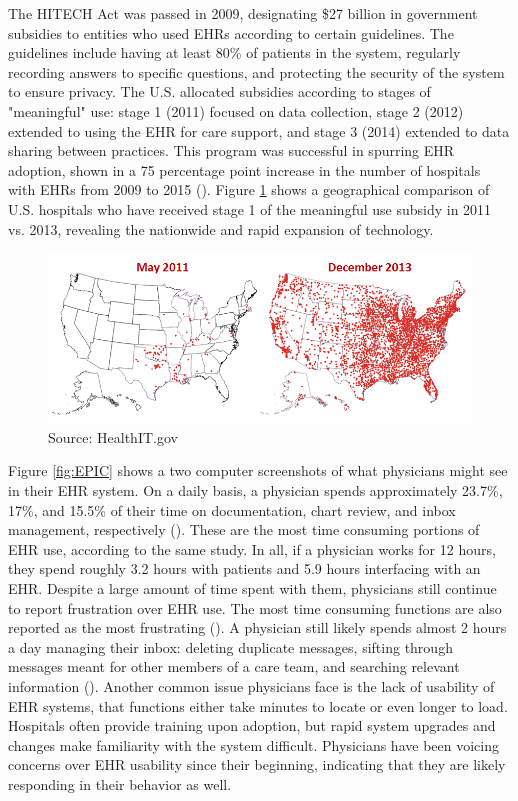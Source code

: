 \documentclass[11pt]{article}
\begin{document}
The HITECH Act was passed in 2009, designating \$27 billion in government subsidies to entities who used EHRs according to certain guidelines. The guidelines include having at least 80\% of patients in the system, regularly recording answers to specific questions, and protecting the security of the system to ensure privacy. The U.S. allocated subsidies according to stages of "meaningful" use: stage 1 (2011) focused on data collection, stage 2 (2012) extended to using the EHR for care support, and stage 3 (2014) extended to data sharing between practices. This program was successful in  spurring EHR adoption, shown in a 75 percentage point increase in the number of hospitals with EHRs from 2009 to 2015 (\cite{stats}). Figure \ref{fig:meanuse} shows a geographical comparison of U.S. hospitals who have received stage 1 of the meaningful use subsidy in 2011 vs. 2013, revealing the nationwide and rapid expansion of technology. 

\begin{figure}[ht]
    \centering
    \captionsetup{width=.6\linewidth}
    \caption{Hospitals Receiving Meaningful Use Stage 1 Subsidy}
    \includegraphics[scale=.6]{Objects/QS-Hospitals-Receiving-Payments-for-MU-and-Adoption.png}
    \caption*{Source: HealthIT.gov}
    \label{fig:meanuse}
\end{figure}

Figure \ref{fig:EPIC} shows a two computer screenshots of what physicians might see in their EHR system. On a daily basis, a physician spends approximately 23.7\%, 17\%, and 15.5\% of their time on documentation, chart review, and inbox management, respectively (\cite{arndt2017tethered}). These are the most time consuming portions of EHR use, according to the same study. In all, if a physician works for 12 hours, they spend roughly 3.2 hours with patients and 5.9 hours interfacing with an EHR. Despite a large amount of time spent with them, physicians still continue to report frustration over EHR use. The most time consuming functions are also reported as the most frustrating (\cite{dymek2021building}). A physician still likely spends almost 2 hours a day managing their inbox: deleting duplicate messages, sifting through messages meant for other members of a care team, and searching relevant information (\cite{dymek2021building}). Another common issue physicians face is the lack of usability of EHR systems, that functions either take minutes to locate or even longer to load. Hospitals often provide training upon adoption, but rapid system upgrades and changes make familiarity with the system difficult. Physicians have been voicing concerns over EHR usability since their beginning, indicating that they are likely responding in their behavior as well.
\end{document}
